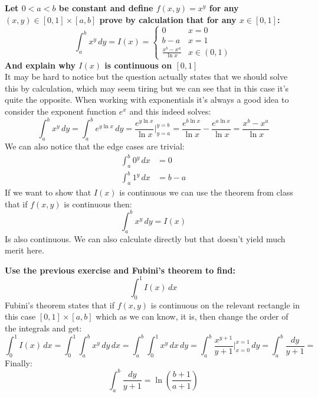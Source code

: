 \documentclass[11pt,a4paper]{article}
\begin{document}
	\textbf{Let $0 < a < b$ be constant and define $f(x,y) = x^y$ for any
	$(x,y)\in[0,1]\times[a,b]$ prove by calculation that for any $x\in[0,1]$:
	\[
		\int_{a}^{b}{x^y\,dy} = I(x) = \begin{cases}
			0 &x=0 \\
			b-a &x=1 \\
			\frac{x^b - x^a}{\ln x} &x\in(0,1)
		\end{cases}
	\]
	And explain why $I(x)$ is continuous on $[0,1]$} \\
	It may be hard to notice but the question actually states that we should
	solve this by calculation, which may seem tiring but we can see that
	in this case it's quite the opposite. When working with exponentials
	it's always a good idea to consider the exponent function $e^x$ and
	this indeed solves:
	\[
		\int_{a}^{b}{x^y\,dy} = 
		\int_{a}^{b}{e^{y\ln x}\,dy} = 
		\frac{e^{y\ln x}}{\ln x} \biggr\vert^{y=b}_{y=a} = 
		\frac{e^{b\ln x}}{\ln x} - 
		\frac{e^{a\ln x}}{\ln x} =
		\frac{x^b - x^a}{\ln x}
	\]
	We can also notice that the edge cases are trivial:
	\begin{align*}
		\int_{a}^{b}{0^y\,dx} &= 0 \\
		\int_{a}^{b}{1^y\,dx} &= b-a
	\end{align*}
	If we want to show that $I(x)$ is continuous we can use the theorem
	from class that if $f(x,y)$ is continuous then:
	\[
		\int_{a}^{b}{x^y\,dy} = I(x)
	\]
	Is also continuous. We can also calculate directly but that doesn't
	yield much merit here.
	
	\newpage
	
	\textbf{Use the previous exercise and Fubini's theorem to find:
	\[
		\int_{0}^{1}{I(x)\,dx}
	\]}
	Fubini's theorem states that if $f(x,y)$ is continuous on the relevant
	rectangle in this case $[0,1]\times[a,b]$ which as we can know, it is,
	then change the order of the integrals and get:
	\[
		\int_{0}^{1}{I(x)\,dx} = 
		\int_{0}^{1}{\int_{a}^{b}{x^y\,dy}\,dx} = 
		\int_{a}^{b}{\int_{0}^{1}{x^y\,dx}\,dy} =
		\int_{a}^{b}{\frac{x^{y+1}}{y+1}\biggr\vert_{x=0}^{x=1}\,dy} = 
		\int_{a}^{b}{\frac{dy}{y+1}} = 
	\]
	Finally:
	\[
		\int_{a}^{b}{\frac{dy}{y+1}} = \ln\left(\frac{b+1}{a+1}\right)
	\]
	
	\newpage
	
\end{document}
